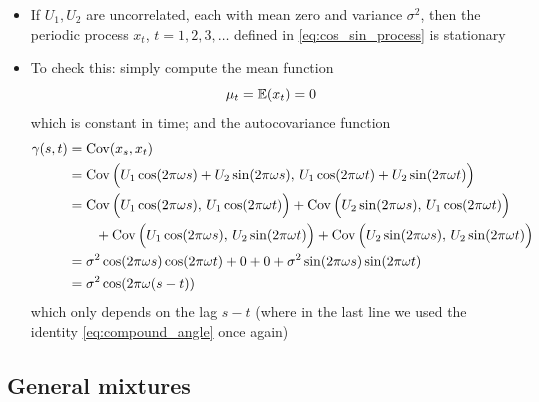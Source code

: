 \documentclass{article}
\begin{document}
\begin{itemize}
\item If $U_1,U_2$ are uncorrelated, each with mean zero and variance
  $\sigma^2$, then the periodic process $x_t$, $t = 1,2,3,\dots$ defined in
  \eqref{eq:cos_sin_process} is stationary 

\item To check this: simply compute the mean function
  \[
  \mu_t = \mathbb{E}(x_t) = 0
  \]
  which is constant in time; and the autocovariance function 
  \begin{align*}
  \gamma(s,t) &= \operatorname{Cov}(x_s, x_t) \\
  &= \operatorname{Cov}\Big( U_1 \cos(2\pi\omega s) + U_2 \sin(2\pi\omega s), \, 
    U_1 \cos(2\pi\omega t) + U_2 \sin(2\pi\omega t) \Big) \\
  &= \operatorname{Cov}\Big( U_1 \cos(2\pi\omega s), \, U_1 \cos(2\pi\omega t) \Big) +
    \operatorname{Cov}\Big( U_2 \sin(2\pi\omega s), \, U_1 \cos(2\pi\omega t) \Big) \\
  &\qquad + \operatorname{Cov}\Big( U_1 \cos(2\pi\omega s), \, U_2 \sin(2\pi\omega t) \Big) +  
     \operatorname{Cov}\Big( U_2 \sin(2\pi\omega s), \, U_2 \sin(2\pi\omega t) \Big) \\
  &=\sigma^2 \cos(2\pi\omega s) \cos(2\pi\omega t) + 0 + 0 + \sigma^2
    \sin(2\pi\omega s) \sin(2\pi\omega t) \\
  &= \sigma^2 \cos(2\pi\omega (s-t))
  \end{align*}
  which only depends on the lag $s-t$ (where in the last line we used the
  identity \eqref{eq:compound_angle} once again)
\end{itemize}

\subsection{General mixtures}
\end{document}
